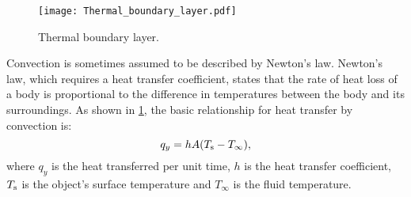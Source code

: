 \begin{figure}[!htp]
	\centering
	\texttt{[image: Thermal\_boundary\_layer.pdf]}
	\caption{Thermal boundary layer.}
	\label{Thermal_boundary_layer}
\end{figure}

Convection is sometimes assumed to be described by Newton's law.
Newton's law, which requires a heat transfer coefficient, states that the rate of heat loss of a body is proportional to the difference in temperatures between the body and its surroundings. %
As shown in \ref{Thermal_boundary_layer}, the basic relationship for heat transfer by convection is:
\begin{equation}
    q_y=hA(T_{\rm{s}}-T_{\infty}),
\end{equation}
where $q_y$ is the heat transferred per unit time, $h$ is the heat transfer coefficient, $T_{\rm{s}}$ is the object's surface temperature and $T_{\infty}$ is the fluid temperature.



